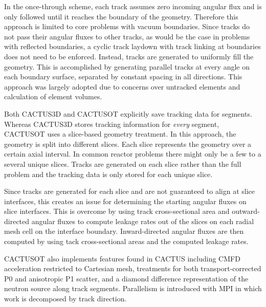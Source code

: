 In the once-through scheme, each track assumes zero incoming angular flux and is only followed until it reaches the boundary of the geometry. Therefore this approach is limited to core problems with vacuum boundaries. Since tracks do not pass their angular fluxes to other tracks, as would be the case in problems with reflected boundaries, a cyclic track laydown with track linking at boundaries does not need to be enforced. Instead, tracks are generated to uniformly fill the geometry. This is accomplished by generating parallel tracks at every angle on each boundary surface, separated by constant spacing in all directions. This approach was largely adopted due to concerns over untracked elements and calculation of element volumes.

Both CACTUS3D and CACTUSOT explicitly save tracking data for segments. Whereas CACTUS3D stores tracking information for \textit{every} segment, CACTUSOT uses a slice-based geometry treatment. In this approach, the geometry is split into different slices. Each slice represents the geometry over a certain axial interval. In common reactor problems there might only be a few to a several unique slices. Tracks are generated on each slice rather than the full problem and the tracking data is only stored for each unique slice. 

Since tracks are generated for each slice and are not guaranteed to align at slice interfaces, this creates an issue for determining the starting angular fluxes on slice interfaces. This is overcome by using track cross-sectional area and outward-directed angular fluxes to compute leakage rates out of the slices on each radial mesh cell on the interface boundary. Inward-directed angular fluxes are then computed by using tack cross-sectional areas and the computed leakage rates.

CACTUSOT also implements features found in CACTUS including \ac{CMFD} acceleration restricted to Cartesian mesh, treatments for both transport-corrected P0 and anisotropic P1 scatter, and a diamond difference representation of the neutron source along track segments. Parallelism is introduced with \ac{MPI} in which work is decomposed by track direction.
